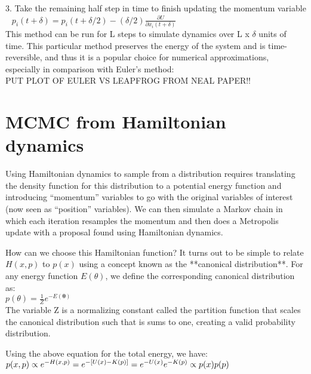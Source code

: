 \documentclass{article}
\begin{document}
3. Take the remaining half step in time to finish updating the momentum variable \\

$~~$ $p_i(t + \delta) = p_i(t + \delta/2) - (\delta/2) \frac{\partial U}{\partial x_i(t+\delta)}$ \\

This method can be run for L steps to simulate dynamics over L x $\delta$ units of time. This particular method preserves the energy of the system and is time-reversible, and thus it is a popular choice for numerical approximations, especially in comparison with Euler's method:\\

PUT PLOT OF EULER VS LEAPFROG FROM NEAL PAPER!!

\section{MCMC from Hamiltonian dynamics}

Using Hamiltonian dynamics to sample from a distribution requires translating the density function for this distribution to a potential energy function and introducing “momentum” variables to go with the original variables of interest (now seen as “position” variables). We can then simulate a Markov chain in which each iteration resamples the momentum and then does a Metropolis update with a proposal found using Hamiltonian dynamics.

How can we choose this Hamiltonian function? It turns out to be simple to relate $H(x, p)$ to $p(x)$ using a concept known as the **canonical distribution**. For any energy function $E(\theta)$, we define the corresponding canonical distribution as:\\

$p(\theta) = \frac{1}{Z}e^{-E(\mathbf\theta)}$\\

The variable Z is a normalizing constant called the partition function that scales the canonical distribution such that is sums to one, creating a valid probability distribution. 

Using the above equation for the total energy, we have:\\

$p(x,p) \propto e^{-H(x,p)} \\ = e^{-[U(x) - K(p)]} \\ = e^{-U(x)}e^{-K(p)} \\ \propto p(x)p(p)$ \\
\end{document}
